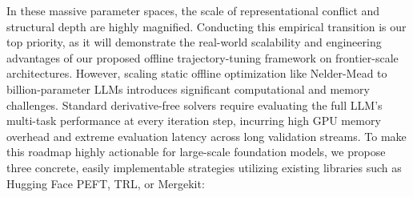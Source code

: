 In these massive parameter spaces, the scale of representational conflict and structural depth are highly magnified.
Conducting this empirical transition is our top priority, as it will demonstrate the real-world scalability and engineering advantages of our proposed offline trajectory-tuning framework on frontier-scale architectures.
However, scaling static offline optimization like Nelder-Mead to
billion-parameter LLMs introduces significant computational and memory
challenges.
Standard derivative-free solvers require evaluating the full LLM's
multi-task performance at every iteration step, incurring high GPU memory
overhead and extreme evaluation latency across long validation streams.
To make
this roadmap highly actionable for large-scale foundation models, we propose
three concrete, easily implementable strategies utilizing existing libraries such
as Hugging Face PEFT, TRL, or Mergekit:

